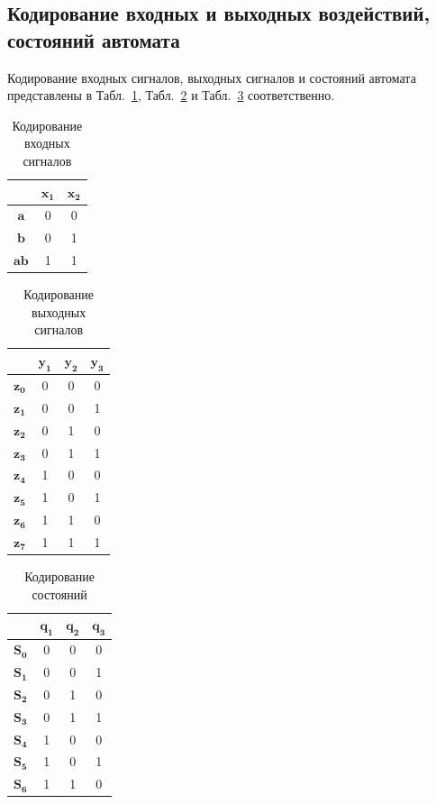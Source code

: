 \documentclass[a4paper, final]{article}
\begin{document}
\subsection{Кодирование входных и выходных воздействий, состояний автомата}
Кодирование входных сигналов, выходных сигналов и состояний автомата представлены в Табл.~\ref{tbl:code_input}, Табл.~\ref{tbl:code_output} и Табл.~\ref{tbl:code_states} соответственно.

\begin{table}[h!]
  \centering
  \caption{Кодирование входных сигналов}
  \label{tbl:code_input}
  \footnotesize
  \begin{tabular}{|c|c|c|}
  \hline
        & $\mathbf{x_1}$& $\mathbf{x_2}$ \\
  \hline
  $\mathbf{a}$ & 0 & 0 \\
  \hline
  $\mathbf{b}$ & 0 & 1 \\
  \hline
  $\mathbf{ab}$ & 1 & 1 \\
  \hline
  \end{tabular}
\end{table}

\begin{table}[h!]
  \centering
  \caption{Кодирование выходных сигналов}
  \label{tbl:code_output}
\begin{tabular}{|c|c|c|c|}
  \hline
        & $\mathbf{y_1}$& $\mathbf{y_2}$ & $\mathbf{y_3}$  \\
  \hline
  $\mathbf{z_0}$ & 0 & 0 & 0 \\
  \hline
  $\mathbf{z_1}$ & 0 & 0 & 1 \\
  \hline
  $\mathbf{z_2}$ & 0 & 1 & 0 \\
  \hline
  $\mathbf{z_3}$ & 0 & 1 & 1 \\
  \hline
  $\mathbf{z_4}$ & 1 & 0 & 0 \\
  \hline
  $\mathbf{z_5}$ & 1 & 0 & 1 \\
  \hline
  $\mathbf{z_6}$ & 1 & 1 & 0 \\
  \hline
  $\mathbf{z_7}$ & 1 & 1 & 1 \\
  \hline
  \end{tabular}
\end{table}

\begin{table}[h!]
  \centering
  \caption{Кодирование состояний}
  \label{tbl:code_states}
  \footnotesize
  \begin{tabular}{|c|c|c|c|}
  \hline
        & $\mathbf{q_1}$& $\mathbf{q_2}$ & $\mathbf{q_3}$  \\
  \hline
  $\mathbf{S_0}$ & 0 & 0 & 0 \\
  \hline
  $\mathbf{S_1}$ & 0 & 0 & 1 \\
  \hline
  $\mathbf{S_2}$ & 0 & 1 & 0 \\
  \hline
  $\mathbf{S_3}$ & 0 & 1 & 1 \\
  \hline
  $\mathbf{S_4}$ & 1 & 0 & 0 \\
  \hline
  $\mathbf{S_5}$ & 1 & 0 & 1 \\
  \hline
  $\mathbf{S_6}$ & 1 & 1 & 0 \\
  \hline
  \end{tabular}
\end{table}
\end{document}
